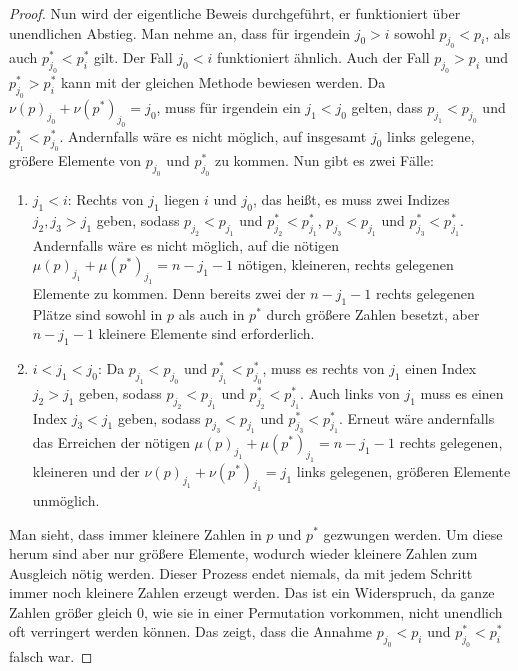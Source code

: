 \documentclass[a4paper, 10pt, ngerman]{article}
\begin{document}
\begin{proof}
    Nun wird der eigentliche Beweis durchgeführt, er funktioniert über unendlichen Abstieg. Man nehme an, dass für irgendein $j_0 > i$ sowohl $p_{j_0} < p_i$, als auch $p^*_{j_0} < p^*_i$ gilt. Der Fall $j_0 < i$ funktioniert ähnlich. Auch der Fall $p_{j_0} > p_i$ und $p^*_{j_0} > p^*_i$ kann mit der gleichen Methode bewiesen werden. Da $\nu(p)_{j_0} + \nu(p^*)_{j_0} = j_0$, muss für irgendein ein $j_1 < j_0$ gelten, dass $p_{j_1} < p_{j_0}$ und $p^*_{j_1} < p^*_{j_0}$. Andernfalls wäre es nicht möglich, auf insgesamt $j_0$ links gelegene, größere Elemente von $p_{j_0}$ und $p^*_{j_0}$ zu kommen. Nun gibt es zwei Fälle:
    \begin{enumerate}
        \item $j_1 < i$: Rechts von $j_1$ liegen $i$ und $j_0$, das heißt, es muss zwei Indizes $j_2, j_3 > j_1$ geben, sodass $p_{j_2} < p_{j_1}$ und $p^*_{j_2} < p^*_{j_1}$, $p_{j_3} < p_{j_1}$ und $p^*_{j_3} < p^*_{j_1}$. Andernfalls wäre es nicht möglich, auf die nötigen $\mu(p)_{j_1} + \mu(p^*)_{j_1} = n - j_1 - 1$ nötigen, kleineren, rechts gelegenen Elemente zu kommen. Denn bereits zwei der $n - j_1 - 1$ rechts gelegenen Plätze sind sowohl in $p$ als auch in $p^*$ durch größere Zahlen besetzt, aber $n - j_1 - 1$ kleinere Elemente sind erforderlich.
        \item $i < j_1 < j_0$: Da $p_{j_1} < p_{j_0}$ und $p^*_{j_1} < p^*_{j_0}$, muss es rechts von $j_1$ einen Index $j_2 > j_1$ geben, sodass $p_{j_2} < p_{j_1}$ und $p^*_{j_2} < p^*_{j_1}$. Auch links von $j_1$ muss es einen Index $j_3 < j_1$ geben, sodass $p_{j_3} < p_{j_1}$ und $p^*_{j_3} < p^*_{j_1}$. Erneut wäre andernfalls das Erreichen der nötigen $\mu(p)_{j_1} + \mu(p^*)_{j_1} = n - j_1 - 1$ rechts gelegenen, kleineren und der $\nu(p)_{j_1} + \nu(p^*)_{j_1} = j_1$ links gelegenen, größeren Elemente unmöglich.
    \end{enumerate}
    Man sieht, dass immer kleinere Zahlen in $p$ und $p^*$ gezwungen werden. Um diese herum sind aber nur größere Elemente, wodurch wieder kleinere Zahlen zum Ausgleich nötig werden. Dieser Prozess endet niemals, da mit jedem Schritt immer noch kleinere Zahlen erzeugt werden. Das ist ein Widerspruch, da ganze Zahlen größer gleich 0, wie sie in einer Permutation vorkommen, nicht unendlich oft verringert werden können. Das zeigt, dass die Annahme $p_{j_0} < p_i$ und $p^*_{j_0} < p^*_i$ falsch war.
\end{proof}
\end{document}
